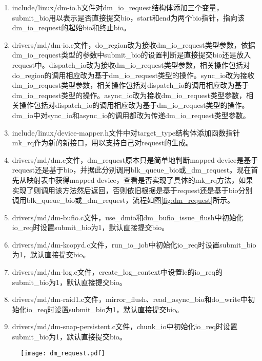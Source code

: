 \begin{enumerate}
    \item include/linux/dm-io.h文件对dm\_io\_request结构体添加三个变量，submit\_bio用以表示是否直接提交bio，start和end为两个bio指针，指向该dm\_io\_request的起始bio和终止bio。
    \item drivers/md/dm-io.c文件，do\_region改为接收dm\_io\_request类型参数，依据dm\_io\_request类型的参数中submit\_bio的设置判断是直接提交bio还是放入request中。dispatch\_io改为接收dm\_io\_request类型参数，相关操作包括对do\_region的调用相应改为基于dm\_io\_request类型的操作。sync\_io改为接收dm\_io\_request类型参数，相关操作包括对dispatch\_io的调用相应改为基于dm\_io\_request类型的操作。async\_io改为接收dm\_io\_request类型参数，相关操作包括对dispatch\_io的调用相应改为基于dm\_io\_request类型的操作。dm\_io中对sync\_io和async\_io的调用都改为传递dm\_io\_request类型参数。
    \item include/linux/device-mapper.h文件中对target\_type结构体添加函数指针mk\_rq作为新的新接口，用以支持自己对request的生成。
    \item drivers/md/dm.c文件，dm\_request原本只是简单地判断mapped device是基于request还是基于bio，并据此分别调用blk\_queue\_bio或\_dm\_request。现在首先从映射表中获得mapped device，查看是否实现了具体的mk\_rq方法，如果实现了则调用该方法然后返回，否则依旧根据是基于request还是基于bio分别调用blk\_queue\_bio或\_dm\_request，流程如图\ref{fig:dm_request}所示。
    \item drivers/md/dm-bufio.c文件，use\_dmio和dm\_bufio\_issue\_flush中初始化io\_req时设置submit\_bio为1，默认直接提交bio。
    \item drivers/md/dm-kcopyd.c文件，run\_io\_job中初始化io\_req时设置submit\_bio为1，默认直接提交bio。
    \item drivers/md/dm-log.c文件，create\_log\_context中设置lc的io\_req的submit\_bio为1，默认直接提交bio。
    \item drivers/md/dm-raid1.c文件，mirror\_flush、read\_async\_bio和do\_write中初始化io\_req时设置submit\_bio为1，默认直接提交bio。
    \item drivers/md/dm-snap-persistent.c文件，chunk\_io中初始化io\_req时设置submit\_bio为1，默认直接提交bio。
\end{enumerate}

\begin{figure}[!htp]
    \centering
    \texttt{[image: dm\_request.pdf]}
\end{figure}


